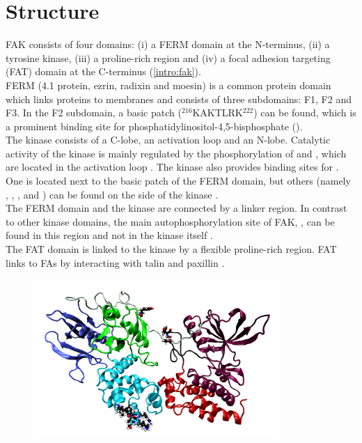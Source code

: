 \section{Structure}
FAK consists of four domains: (i) a FERM domain at the N-terminus, (ii) a tyrosine kinase, (iii) a proline-rich region and (iv) a focal adhesion targeting (FAT) domain at the C-terminus (\autoref{intro:fak}).\\
FERM (4.1 protein, ezrin, radixin and moesin) is a common protein domain which links proteins to membranes \autocite{fermdomain} and consists of three subdomains: F1, F2 and F3. In the F2 subdomain, a basic patch ($^{216}$KAKTLRK$^{222}$) can be found, which is a prominent binding site for phosphatidylinositol-4,5-bisphosphate (\pip).\\
The kinase consists of a C-lobe, an activation loop and an N-lobe. Catalytic activity of the kinase is mainly regulated by the phosphorylation of  and , which are located in the activation loop \autocite{tyrosinePhosphor}. The kinase also provides binding sites for \pip{}. One is located next to the basic patch of the FERM domain, but others (namely , , ,  and ) can be found on the side of the kinase \autocites{pap002}{pap002Exp}.\\
The FERM domain and the kinase are connected by a linker region. In contrast to other kinase domains, the main autophosphorylation site of FAK, , can be found in this region and not in the kinase itself \autocite{pap001}.\\ %
The FAT domain is linked to the kinase by a flexible proline-rich region. FAT links to FAs by interacting with talin and paxillin \autocite{fatdomain}.
%
%
%
\begin{figure}
	\centering
	\includegraphics[height=6cm]{figures/introduction/fak}
	\label{intro:fak}
\end{figure}
%
%
%
